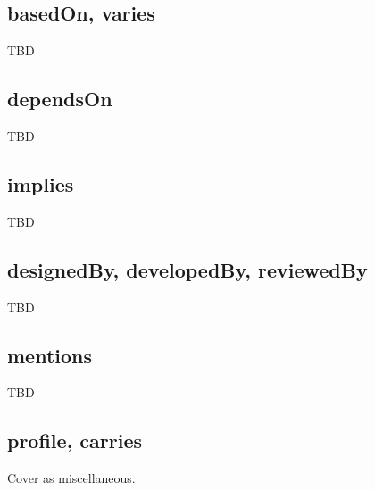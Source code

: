 
\subsection{basedOn, varies}

TBD

\begin{comment}
Contributions based on other contributions
Contributions varying other contributions
\end{comment}


\subsection{dependsOn}

TBD


\subsection{implies}

TBD


\subsection{designedBy, developedBy, reviewedBy}

TBD


\subsection{mentions}



TBD


\subsection{profile, carries}

Cover as miscellaneous.

